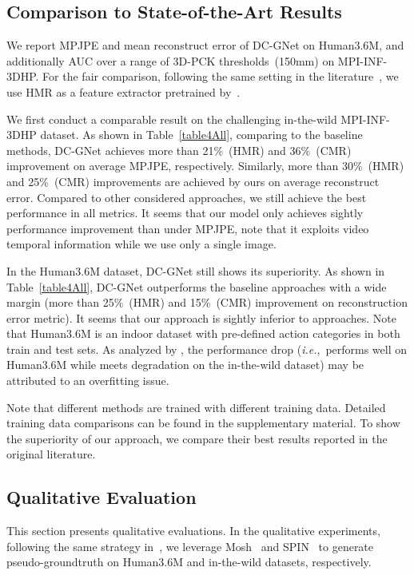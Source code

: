 \documentclass[sigplan]{acmart}
\def\ie{\emph{i.e.}}
\begin{document}
\subsection{Comparison to State-of-the-Art Results}
\label{subsec:com2SOTA}
We report MPJPE and mean reconstruct error of DC-GNet on Human3.6M, and additionally AUC over a range of 3D-PCK thresholds~(150mm) on MPI-INF-3DHP. For the fair comparison, following the same setting in the literature~\cite{kocabas2019vibe}, we use HMR as a feature extractor pretrained by~\cite{kolotouros2019spin}.

We first conduct a comparable result on the challenging in-the-wild MPI-INF-3DHP dataset. As shown in Table~\ref{table4All}, comparing to the baseline methods, DC-GNet achieves more than 21\%~(HMR) and 36\%~(CMR) improvement on average MPJPE, respectively. Similarly, more than 30\%~(HMR) and 25\%~(CMR) improvements are achieved by ours on average reconstruct error. Compared to other considered approaches, we still achieve the best performance in all metrics. It seems that our model only achieves sightly performance improvement than \cite{kocabas2019vibe} under MPJPE, note that it exploits video temporal information while we use only a single image.

In the Human3.6M dataset, DC-GNet still shows its superiority. As shown in Table~\ref{table4All}, DC-GNet outperforms the baseline approaches with a wide margin (more than 25\%~(HMR) and 15\%~(CMR) improvement on reconstruction error metric). It seems that our approach is sightly inferior to approaches\cite{DenseCorrespondence,kolotouros2019spin,kocabas2019vibe}. Note that Human3.6M is an indoor dataset with pre-defined action categories in both train and test sets. As analyzed by \cite{Choi_2020_ECCV_Pose2Mesh}, the performance drop (\ie,~performs well on Human3.6M while meets degradation on the in-the-wild dataset) may be attributed to an overfitting issue. 

Note that different methods are trained with different training data. Detailed training data comparisons can be found in the supplementary material. To show the superiority of our approach, we compare their best results reported in the original literature. 



\subsection{Qualitative Evaluation}
\label{subsec:qualitative}
This section presents qualitative evaluations. In the qualitative experiments, following the same strategy in~\cite{kolotouros2019convolutional,kanazawa2018end-to-end,kolotouros2019spin}, we leverage Mosh~\cite{mosh2014} and SPIN~\cite{kolotouros2019spin} to generate pseudo-groundtruth on Human3.6M and in-the-wild datasets, respectively.
\end{document}
